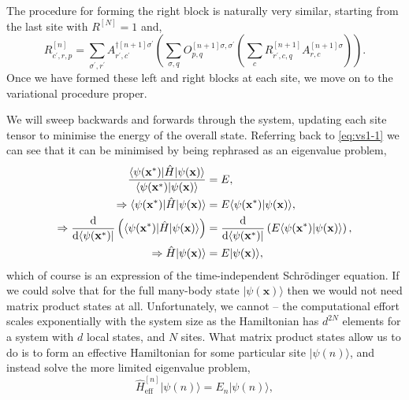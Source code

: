 The procedure for forming the right block is naturally very similar, starting from the last site with \(R^{[N]} = 1\) and,
\begin{equation}
R^{[n]}_{c^{\prime}, r, p} = \sum_{\sigma^{\prime}, r^{\prime}} A^{\dagger [n+1] \sigma^{\prime}}_{r^{\prime}, c^{\prime}} \left( \sum_{\sigma, q} O^{[n+1] \sigma, \sigma^{\prime}}_{p, q} \left( \sum_{c} R^{[n+1]}_{r^{\prime}, c, q} A^{[n+1] \sigma}_{r, c} \right) \right).
\label{eq:vs1-5}
\end{equation}
Once we have formed these left and right blocks at each site, we move on to the variational procedure proper.

We will sweep backwards and forwards through the system, updating each site tensor to minimise the energy of the overall state. Referring back to \cref{eq:vs1-1} we can see that it can be minimised by being rephrased as an eigenvalue problem,
\begin{align}
\frac{\langle \psi(\mathbf{x}^{*}) | \hat{H} | \psi(\mathbf{x}) \rangle}{\langle \psi(\mathbf{x}^{*}) | \psi(\mathbf{x}) \rangle } &= E, \notag \\
\Rightarrow \langle \psi(\mathbf{x}^{*}) | \hat{H} | \psi(\mathbf{x}) \rangle &= E \langle \psi(\mathbf{x}^{*}) | \psi(\mathbf{x}) \rangle, \notag \\
\Rightarrow \frac{\mathrm{d}}{\mathrm{d}\langle \psi(\mathbf{x}^{*}) |} \left( \langle \psi(\mathbf{x}^{*}) | \hat{H} | \psi(\mathbf{x}) \rangle \right) &= \frac{\mathrm{d}}{\mathrm{d}\langle \psi(\mathbf{x}^{*}) |} \left(  E \langle \psi(\mathbf{x}^{*}) | \psi(\mathbf{x}) \rangle \right), \notag \\
\Rightarrow \hat{H} |\psi(\mathbf{x}) \rangle &= E | \psi(\mathbf{x}) \rangle,
\label{eq:vs1-6}
\end{align}
which of course is an expression of the time-independent Schr\"{o}dinger equation. If we could solve that for the full many-body state \(| \psi (\mathbf{x}) \rangle\) then we would not need matrix product states at all. Unfortunately, we cannot -- the computational effort scales exponentially with the system size as the Hamiltonian has \(d^{2N}\) elements for a system with \(d\) local states, and \(N\) sites. What matrix product states allow us to do is to form an effective Hamiltonian for some particular site \(| \psi (n) \rangle\), and instead solve the more limited eigenvalue problem,
\begin{equation}
\hat{H}_{\mathrm{eff}}^{[n]} |\psi (n) \rangle = E_{n} |\psi (n) \rangle,
\label{eq:vs1-7}
\end{equation}

